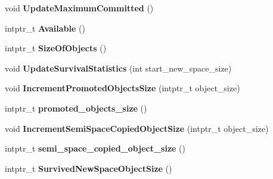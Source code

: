 \begin{DoxyCompactItemize}
\item 
void {\bfseries Update\+Maximum\+Committed} ()\hypertarget{classv8_1_1internal_1_1_heap_ab5c8ff35e85c8d285b2bee58bb10fa80}{}\label{classv8_1_1internal_1_1_heap_ab5c8ff35e85c8d285b2bee58bb10fa80}

\item 
intptr\+\_\+t {\bfseries Available} ()\hypertarget{classv8_1_1internal_1_1_heap_a79fbb6f19e2e4193920ef94d5dec54d4}{}\label{classv8_1_1internal_1_1_heap_a79fbb6f19e2e4193920ef94d5dec54d4}

\item 
intptr\+\_\+t {\bfseries Size\+Of\+Objects} ()\hypertarget{classv8_1_1internal_1_1_heap_ae864c40e24bf7d6fcdbfbf97ac309d14}{}\label{classv8_1_1internal_1_1_heap_ae864c40e24bf7d6fcdbfbf97ac309d14}

\item 
void {\bfseries Update\+Survival\+Statistics} (int start\+\_\+new\+\_\+space\+\_\+size)\hypertarget{classv8_1_1internal_1_1_heap_af89dc6bf47318b59b29e423d8f88783b}{}\label{classv8_1_1internal_1_1_heap_af89dc6bf47318b59b29e423d8f88783b}

\item 
void {\bfseries Increment\+Promoted\+Objects\+Size} (intptr\+\_\+t object\+\_\+size)\hypertarget{classv8_1_1internal_1_1_heap_a65f4c6990cd7e7fa65dcc5c2b273f1c9}{}\label{classv8_1_1internal_1_1_heap_a65f4c6990cd7e7fa65dcc5c2b273f1c9}

\item 
intptr\+\_\+t {\bfseries promoted\+\_\+objects\+\_\+size} ()\hypertarget{classv8_1_1internal_1_1_heap_a76d646e4f4e2a7aea991f7b1ee17b11a}{}\label{classv8_1_1internal_1_1_heap_a76d646e4f4e2a7aea991f7b1ee17b11a}

\item 
void {\bfseries Increment\+Semi\+Space\+Copied\+Object\+Size} (intptr\+\_\+t object\+\_\+size)\hypertarget{classv8_1_1internal_1_1_heap_a18dea537bf444076d2adbf59286c04c8}{}\label{classv8_1_1internal_1_1_heap_a18dea537bf444076d2adbf59286c04c8}

\item 
intptr\+\_\+t {\bfseries semi\+\_\+space\+\_\+copied\+\_\+object\+\_\+size} ()\hypertarget{classv8_1_1internal_1_1_heap_a2cc7098d4e04d9af541d61d07dd0387d}{}\label{classv8_1_1internal_1_1_heap_a2cc7098d4e04d9af541d61d07dd0387d}

\item 
intptr\+\_\+t {\bfseries Survived\+New\+Space\+Object\+Size} ()\hypertarget{classv8_1_1internal_1_1_heap_afbc9f28add89c2404baf990bffaf3864}{}\label{classv8_1_1internal_1_1_heap_afbc9f28add89c2404baf990bffaf3864}


\end{DoxyCompactItemize}
